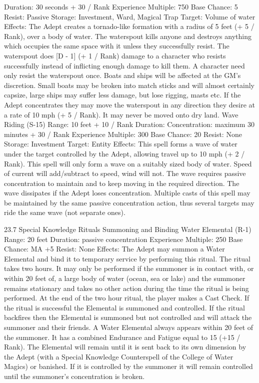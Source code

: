 \documentclass[a4paper]{article}
\begin{document}
\begin{multicols}{3}
Duration: 30 seconds + 30 / Rank
Experience Multiple: 750
Base Chance: 5%
Resist: Passive
Storage: Investment, Ward, Magical Trap
Target: Volume of water
Effects: The Adept creates a tornado-like formation
with a radius of 5 feet (+ 5 / Rank), over a body of
water. The waterspout kills anyone and destroys
anything which occupies the same space with it
unless they successfully resist. The waterspout
does [D - 1] (+ 1 / Rank) damage to a character
who resists successfully instead of inflicting
enough damage to kill them. A character need only
resist the waterspout once. Boats and ships will be
affected at the GM’s discretion. Small boats may
be broken into match sticks and will almost certainly capsize, large ships may suffer less damage,
but lose rigging, masts etc. If the Adept concentrates they may move the waterspout in any direction they desire at a rate of 10 mph (+ 5 / Rank). It
may never be moved onto dry land.
Wave Riding (S-15)
Range: 10 feet + 10 / Rank
Duration: Concentration: maximum 30 minutes +
30 / Rank
Experience Multiple: 300
Base Chance: 20%
Resist: None
Storage: Investment
Target: Entity
Effects: This spell forms a wave of water under the
target controlled by the Adept, allowing travel up
to 10 mph (+ 2 / Rank). This spell will only form a
wave on a suitably sized body of water. Speed of
current will add/subtract to speed, wind will not.
The wave requires passive concentration to maintain and to keep moving in the required direction.
The wave dissipates if the Adept loses concentration. Multiple casts of this spell may be maintained
by the same passive concentration action, thus
several targets may ride the same wave (not separate ones).

23.7 Special Knowledge Rituals
Summoning and Binding Water Elemental
(R-1)
Range: 20 feet
Duration: passive concentration
Experience Multiple: 250
Base Chance: MA +5%
Resist: None
Effects: The Adept may summon a Water Elemental and bind it to temporary service by performing
this ritual. The ritual takes two hours. It may only
be performed if the summoner is in contact with, or
within 20 feet of, a large body of water (ocean, sea
or lake) and the summoner remains stationary and
takes no other action during the time the ritual is
being performed. At the end of the two hour ritual,
the player makes a Cast Check. If the ritual is
successful the Elemental is summoned and controlled. If the ritual backfires then the Elemental is
summoned but not controlled and will attack the
summoner and their friends.
A Water Elemental always appears within 20 feet
of the summoner. It has a combined Endurance and
Fatigue equal to 15 (+15 / Rank). The Elemental
will remain until it is sent back to its own dimension by the Adept (with a Special Knowledge
Counterspell of the College of Water Magics) or
banished. If it is controlled by the summoner it will
remain controlled until the summoner’s concentration is broken.


\end{multicols}
\end{document}
